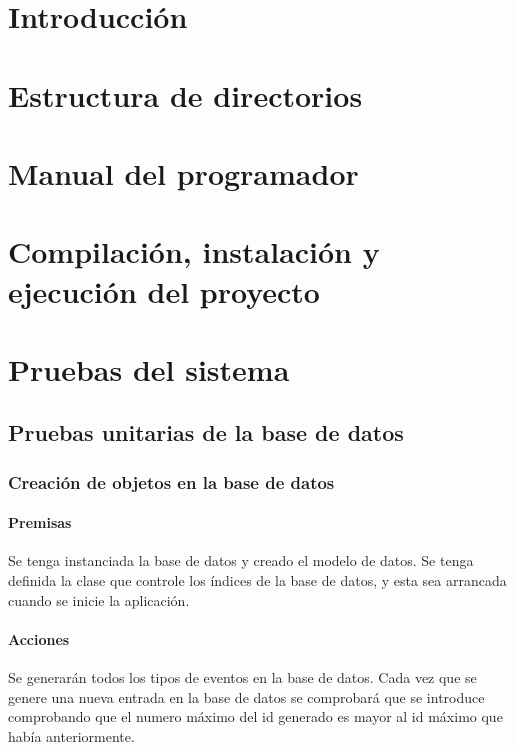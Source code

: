
\section{Introducción}

\section{Estructura de directorios}

\section{Manual del programador}

\section{Compilación, instalación y ejecución del proyecto}

\section{Pruebas del sistema}

\subsection{Pruebas unitarias de la base de datos}

\subsubsection{Creación de objetos en la base de datos}

\paragraph{Premisas}
Se tenga instanciada la base de datos y creado el modelo de datos.
Se tenga definida la clase que controle los índices de la base de datos, y esta sea arrancada cuando se inicie la aplicación.

\paragraph{Acciones}
Se generarán todos los tipos de eventos en la base de datos.
Cada vez que se genere una nueva entrada en la base de datos se comprobará que se introduce comprobando que el numero máximo del id generado es mayor al id máximo que había anteriormente.

